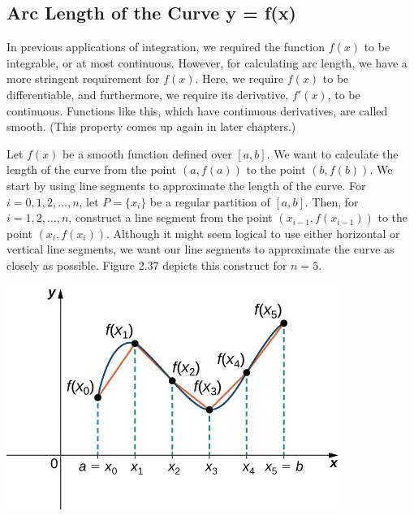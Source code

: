 \documentclass{report}
\begin{document}
    \bigbreak \noindent 
    \subsection*{Arc Length of the Curve y = f(x)}
    \bigbreak \noindent 
    In previous applications of integration, we required the function \(f(x)\) to be integrable, or at most continuous. However, for calculating arc length, we have a more stringent requirement for \(f(x)\). Here, we require \(f(x)\) to be differentiable, and furthermore, we require its derivative, \(f'(x)\), to be continuous. Functions like this, which have continuous derivatives, are called smooth. (This property comes up again in later chapters.)
    \bigbreak \noindent 
    \begin{minipage}[]{0.47\textwidth}
        Let \(f(x)\) be a smooth function defined over \([a,b]\). We want to calculate the length of the curve from the point \((a,f(a))\) to the point \((b,f(b))\). We start by using line segments to approximate the length of the curve. For \(i=0,1,2,\ldots,n\), let \(P=\{x_i\}\) be a regular partition of \([a,b]\). Then, for \(i=1,2,\ldots,n\), construct a line segment from the point \((x_{i-1},f(x_{i-1}))\) to the point \((x_i,f(x_i))\). Although it might seem logical to use either horizontal or vertical line segments, we want our line segments to approximate the curve as closely as possible. Figure 2.37 depicts this construct for \(n=5\).
    \end{minipage}
    \begin{minipage}[]{0.47\textwidth}
        \begin{center}
        \includegraphics[scale=0.5]{./figures/ezgif.com-webp-to-png (1).png}
    \end{center}
    \end{minipage}
\end{document}
